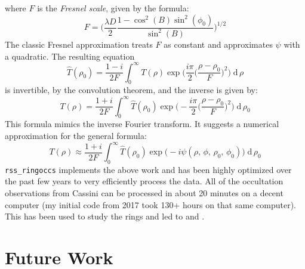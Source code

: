 \documentclass{article}
\theoremstyle{plain}
\begin{document}
            where $F$ is the \textit{Fresnel scale}, given by the formula:
            \begin{equation}
                F=\Big(
                    \frac{\lambda{D}}{2}
                    \frac{1-\cos^{2}(B)\sin^{2}(\phi_{0})}{\sin^{2}(B)}
                \Big)^{1/2}
            \end{equation}
            The classic Fresnel approximation treats $F$ as constant and
            approximates $\psi$ with a quadratic. The resulting equation
            \begin{equation}
                \hat{T}(\rho_{0})=
                    \frac{1-i}{2F}
                    \int_{0}^{\infty}
                        T(\rho)
                        \exp\Big(\frac{i\pi}{2}
                            \big(\frac{\rho-\rho_{0}}{F}\big)^{2}
                        \Big)\;
                    \textrm{d}\,\rho
            \end{equation}
            is invertible, by the convolution theorem,
            and the inverse is given by:
            \begin{equation}
                T(\rho)=
                    \frac{1+i}{2F}
                    \int_{0}^{\infty}
                        \hat{T}(\rho_{0})
                        \exp\Big(
                            -\frac{i\pi}{2}\big(\frac{\rho-\rho_{0}}{F}\big)^{2}
                        \Big)\;
                    \textrm{d}\,\rho_{0}
            \end{equation}
            This formula mimics the inverse Fourier transform. It suggests a
            numerical approximation for the general formula:
            \begin{equation}
                T(\rho)\approx
                    \frac{1+i}{2F}
                    \int_{0}^{\infty}
                        \hat{T}(\rho_{0})
                        \exp\big(
                            -i\psi(\rho,\,\phi,\,\rho_{0},\,\phi_{0})
                        \big)\;
                    \textrm{d}\,\rho_{0}
            \end{equation}
            \texttt{rss\_ringoccs} implements the above work and has been
            highly optimized over the past few years to very efficiently
            process the data. All of the occultation observations from Cassini
            can be processed in about 20 minutes on a decent computer
            (my initial code from 2017 took 130+ hours on that same computer).
            This has been used to study the rings and led to
            \cite{FRENCH2023115678} and \cite{NICHOLSON2023115287}.
    \section{Future Work}
    \newpage
    
    
\end{document}
